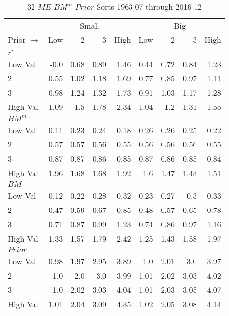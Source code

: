 
\begin{table}[!ht]
\centering
\caption{32-$ME$-$BM^m$-$Prior$ Sorts 1963-07 through 2016-12}
\begin{tabular}{lrrrrrrrr}
  \toprule
    & \multicolumn{4}{c}{Small} & \multicolumn{4}{c}{Big} \\
      \cmidrule(r){2-5} \cmidrule(r){6-9}
  Prior $\rightarrow$ & Low & 2 & 3 & High & Low & 2 & 3 & High \\ 
  \midrule
  

    \multicolumn{9}{l}{$r^i$} \\
    Low Val    & -0.0  & 0.68  & 0.89  & 1.46  & 0.44  & 0.72  & 0.84  & 1.23  \\
           2   & 0.55  & 1.02  & 1.18  & 1.69  & 0.77  & 0.85  & 0.97  & 1.11  \\
           3   & 0.98  & 1.24  & 1.32  & 1.73  & 0.91  & 1.03  & 1.17  & 1.28  \\
    High Val   & 1.09  & 1.5  & 1.78  & 2.34  & 1.04  & 1.2  & 1.31  & 1.55  \\
    [1em]
  

    \multicolumn{9}{l}{$BM^m$} \\
    Low Val    & 0.11  & 0.23  & 0.24  & 0.18  & 0.26  & 0.26  & 0.25  & 0.22  \\
           2   & 0.57  & 0.57  & 0.56  & 0.55  & 0.56  & 0.56  & 0.56  & 0.55  \\
           3   & 0.87  & 0.87  & 0.86  & 0.85  & 0.87  & 0.86  & 0.85  & 0.84  \\
    High Val   & 1.96  & 1.68  & 1.68  & 1.92  & 1.6  & 1.47  & 1.43  & 1.51  \\
    [1em]
  

    \multicolumn{9}{l}{$BM$} \\
    Low Val    & 0.12  & 0.22  & 0.28  & 0.32  & 0.23  & 0.27  & 0.3  & 0.33  \\
           2   & 0.47  & 0.59  & 0.67  & 0.85  & 0.48  & 0.57  & 0.65  & 0.78  \\
           3   & 0.71  & 0.87  & 0.99  & 1.23  & 0.74  & 0.86  & 0.97  & 1.16  \\
    High Val   & 1.33  & 1.57  & 1.79  & 2.42  & 1.25  & 1.43  & 1.58  & 1.97  \\
    [1em]
  

    \multicolumn{9}{l}{$Prior$} \\
    Low Val    & 0.98  & 1.97  & 2.95  & 3.89  & 1.0  & 2.01  & 3.0  & 3.97  \\
           2   & 1.0  & 2.0  & 3.0  & 3.99  & 1.01  & 2.02  & 3.03  & 4.02  \\
           3   & 1.0  & 2.02  & 3.03  & 4.04  & 1.01  & 2.03  & 3.05  & 4.07  \\
    High Val   & 1.01  & 2.04  & 3.09  & 4.35  & 1.02  & 2.05  & 3.08  & 4.14  \\
    [1em]
  


\end{tabular}
\end{table}
